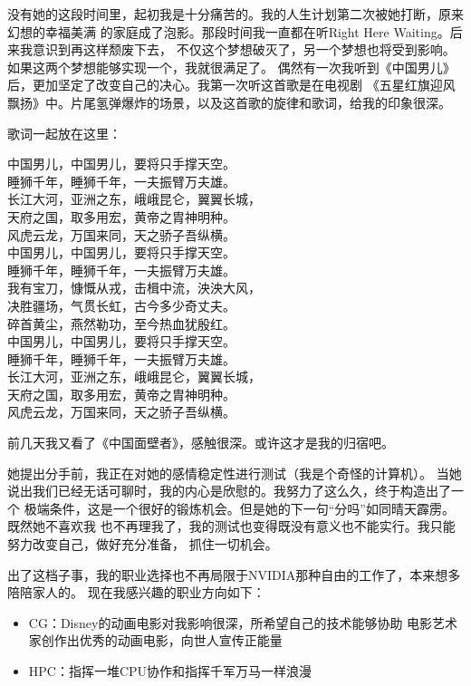没有她的这段时间里，起初我是十分痛苦的。我的人生计划第二次被她打断，原来幻想的幸福美满
的家庭成了泡影。那段时间我一直都在听Right Here Waiting。后来我意识到再这样颓废下去，
不仅这个梦想破灭了，另一个梦想也将受到影响。如果这两个梦想能够实现一个，我就很满足了。
偶然有一次我听到《中国男儿》后，更加坚定了改变自己的决心。我第一次听这首歌是在电视剧
《五星红旗迎风飘扬》中。片尾氢弹爆炸的场景，以及这首歌的旋律和歌词，给我的印象很深。

歌词一起放在这里：
\begin{center}
中国男儿，中国男儿，要将只手撑天空。\\
睡狮千年，睡狮千年，一夫振臂万夫雄。\\
长江大河，亚洲之东，峨峨昆仑，翼翼长城，\\
天府之国，取多用宏，黄帝之胄神明种。\\
风虎云龙，万国来同，天之骄子吾纵横。\\
中国男儿，中国男儿，要将只手撑天空。\\
睡狮千年，睡狮千年，一夫振臂万夫雄。\\
我有宝刀，慷慨从戎，击楫中流，泱泱大风，\\
决胜疆场，气贯长虹，古今多少奇丈夫。\\
碎首黄尘，燕然勒功，至今热血犹殷红。\\
中国男儿，中国男儿，要将只手撑天空。\\
睡狮千年，睡狮千年，一夫振臂万夫雄。\\
长江大河，亚洲之东，峨峨昆仑，翼翼长城，\\
天府之国，取多用宏，黄帝之胄神明种。\\
风虎云龙，万国来同，天之骄子吾纵横。\\
\end{center}

前几天我又看了《中国面壁者》，感触很深。或许这才是我的归宿吧。

她提出分手前，我正在对她的感情稳定性进行测试（我是个奇怪的计算机）。
当她说出我们已经无话可聊时，我的内心是欣慰的。我努力了这么久，终于构造出了一个
极端条件，这是一个很好的锻炼机会。但是她的下一句``分吗''如同晴天霹雳。既然她不喜欢我
也不再理我了，我的测试也变得既没有意义也不能实行。我只能努力改变自己，做好充分准备，
抓住一切机会。

出了这档子事，我的职业选择也不再局限于NVIDIA那种自由的工作了，本来想多陪陪家人的。
现在我感兴趣的职业方向如下：
\begin{itemize}
    \item CG：Disney的动画电影对我影响很深，所希望自己的技术能够协助
    电影艺术家创作出优秀的动画电影，向世人宣传正能量
    \item HPC：指挥一堆CPU协作和指挥千军万马一样浪漫
\end{itemize}

